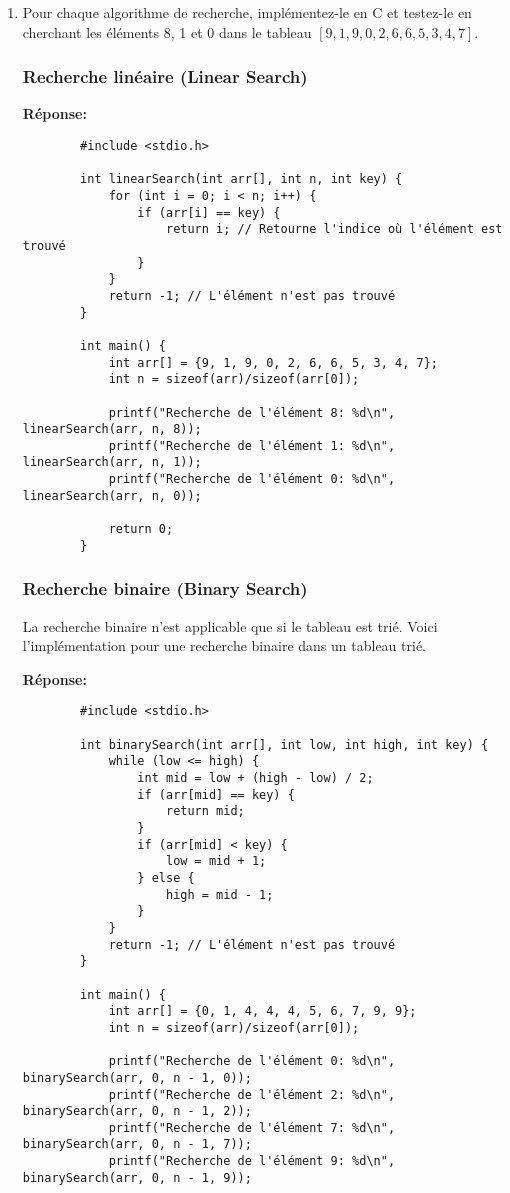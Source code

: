 \begin{enumerate}
	\item Pour chaque algorithme de recherche, implémentez-le en C et testez-le en cherchant les éléments 8, 1 et 0 dans le tableau \([9, 1, 9, 0, 2, 6, 6, 5, 3, 4, 7]\).
	
	\subsubsection{Recherche linéaire (Linear Search)}
	
	\textbf{Réponse:}
	\begin{lstlisting}
		#include <stdio.h>
		
		int linearSearch(int arr[], int n, int key) {
			for (int i = 0; i < n; i++) {
				if (arr[i] == key) {
					return i; // Retourne l'indice où l'élément est trouvé
				}
			}
			return -1; // L'élément n'est pas trouvé
		}
		
		int main() {
			int arr[] = {9, 1, 9, 0, 2, 6, 6, 5, 3, 4, 7};
			int n = sizeof(arr)/sizeof(arr[0]);
			
			printf("Recherche de l'élément 8: %d\n", linearSearch(arr, n, 8));
			printf("Recherche de l'élément 1: %d\n", linearSearch(arr, n, 1));
			printf("Recherche de l'élément 0: %d\n", linearSearch(arr, n, 0));
			
			return 0;
		}
	\end{lstlisting}
	
	\subsubsection{Recherche binaire (Binary Search)}
	
	La recherche binaire n'est applicable que si le tableau est trié. Voici l'implémentation pour une recherche binaire dans un tableau trié.
	
	\textbf{Réponse:}
	\begin{lstlisting}
		#include <stdio.h>
		
		int binarySearch(int arr[], int low, int high, int key) {
			while (low <= high) {
				int mid = low + (high - low) / 2;
				if (arr[mid] == key) {
					return mid;
				}
				if (arr[mid] < key) {
					low = mid + 1;
				} else {
					high = mid - 1;
				}
			}
			return -1; // L'élément n'est pas trouvé
		}
		
		int main() {
			int arr[] = {0, 1, 4, 4, 4, 5, 6, 7, 9, 9};
			int n = sizeof(arr)/sizeof(arr[0]);
			
			printf("Recherche de l'élément 0: %d\n", binarySearch(arr, 0, n - 1, 0));
			printf("Recherche de l'élément 2: %d\n", binarySearch(arr, 0, n - 1, 2));
			printf("Recherche de l'élément 7: %d\n", binarySearch(arr, 0, n - 1, 7));
			printf("Recherche de l'élément 9: %d\n", binarySearch(arr, 0, n - 1, 9));
			

\end{lstlisting}
\end{enumerate}

